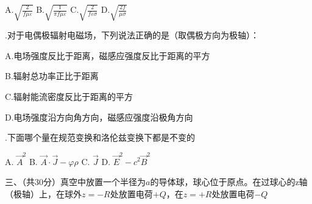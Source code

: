 A.\hspace{0.8em}$\displaystyle{ \sqrt{\frac{2}{f \mu \varepsilon} } }$\hspace{5em}
B.\hspace{0.8em}$\displaystyle{ \sqrt{\frac{1}{\pi  f \mu \varepsilon} } }$\hspace{5em}
C.\hspace{0.8em}$\displaystyle{ \sqrt{\frac{2}{f \varepsilon \sigma} } }$\hspace{5em}
D.\hspace{0.8em}$\displaystyle{ \sqrt{\frac{ 2f }{ \mu \sigma} } }$\vspace{0.3cm}

.\hspace{0.8em}对于电偶极辐射电磁场，下列说法正确的是（取偶极方向为极轴）：\vspace{0.2cm}

A.\hspace{0.8em}电场强度反比于距离，磁感应强度反比于距离的平方\vspace{0.1cm}

B.\hspace{0.8em}辐射总功率正比于距离\vspace{0.1cm}

C.\hspace{0.8em}辐射能流密度反比于距离的平方\vspace{0.1cm}

D.\hspace{0.8em}电场强度沿方向角方向，磁感应强度沿极角方向

\vspace{0.3cm}

.\hspace{0.8em}下面哪个量在规范变换和洛伦兹变换下都是不变的\vspace{0.3cm}

A.\hspace{0.8em} $\Vec{A}^2$\hspace{5em} B.\hspace{0.8em} $\Vec{A} \cdot \Vec{J} - \varphi \rho$ \hspace{5em} C.\hspace{0.8em} $\Vec{J}$ \hspace{5em} D.\hspace{0.8em} $\Vec{E}^2 - c^2 \Vec{B}^2 $

\newpage

\noindent
三、\hspace{0.2em}（共30分）真空中放置一个半径为$a$的导体球，球心位于原点。在过球心的z轴（极轴）上，在球外$z = -R$处放置电荷$+Q$，在$z = +R$处放置电荷$-Q$
\vspace{0.2cm}

